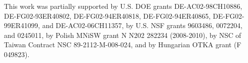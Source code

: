 %
%
%
%
This work was partially supported by U.S. DOE grants 
DE-AC02-98CH10886,
DE-FG02-93ER40802, 
DE-FG02-94ER40818,  %
DE-FG02-94ER40865, 
DE-FG02-99ER41099, and
DE-AC02-06CH11357, by U.S. 
NSF grants 9603486, %
0072204,            %
and 0245011,        %
by Polish MNiSW grant N N202 282234 (2008-2010),
by NSC of Taiwan Contract NSC 89-2112-M-008-024, and
by Hungarian OTKA grant (F 049823).
